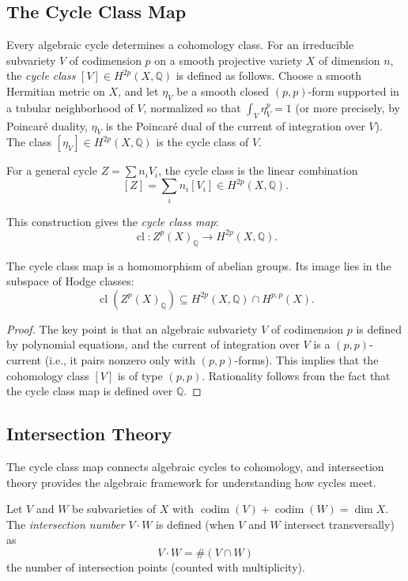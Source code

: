 \subsection{The Cycle Class Map}

Every algebraic cycle determines a cohomology class. For an irreducible subvariety $V$ of codimension $p$ on a smooth projective variety $X$ of dimension $n$, the \emph{cycle class} $[V] \in H^{2p}(X, \mathbb{Q})$ is defined as follows. Choose a smooth Hermitian metric on $X$, and let $\eta_V$ be a smooth closed $(p,p)$-form supported in a tubular neighborhood of $V$, normalized so that $\int_V \eta_V^p = 1$ (or more precisely, by Poincar\'{e} duality, $\eta_V$ is the Poincar\'{e} dual of the current of integration over $V$). The class $[\eta_V] \in H^{2p}(X, \mathbb{Q})$ is the cycle class of $V$.

For a general cycle $Z = \sum n_i V_i$, the cycle class is the linear combination
\[
[Z] = \sum_i n_i [V_i] \in H^{2p}(X, \mathbb{Q}).
\]

This construction gives the \emph{cycle class map}:
\[
\operatorname{cl}: Z^p(X)_{\mathbb{Q}} \to H^{2p}(X, \mathbb{Q}).
\]

\begin{proposition}
The cycle class map is a homomorphism of abelian groups. Its image lies in the subspace of Hodge classes:
\[
\operatorname{cl}(Z^p(X)_{\mathbb{Q}}) \subseteq H^{2p}(X, \mathbb{Q}) \cap H^{p,p}(X).
\]
\end{proposition}

\begin{proof}
The key point is that an algebraic subvariety $V$ of codimension $p$ is defined by polynomial equations, and the current of integration over $V$ is a $(p,p)$-current (i.e., it pairs nonzero only with $(p,p)$-forms). This implies that the cohomology class $[V]$ is of type $(p,p)$. Rationality follows from the fact that the cycle class map is defined over $\mathbb{Q}$.
\end{proof}

\subsection{Intersection Theory}

The cycle class map connects algebraic cycles to cohomology, and intersection theory provides the algebraic framework for understanding how cycles meet.

\begin{definition}
Let $V$ and $W$ be subvarieties of $X$ with $\operatorname{codim}(V) + \operatorname{codim}(W) = \dim X$. The \emph{intersection number} $V \cdot W$ is defined (when $V$ and $W$ intersect transversally) as
\[
V \cdot W = \#(V \cap W)
\]
the number of intersection points (counted with multiplicity).
\end{definition}

